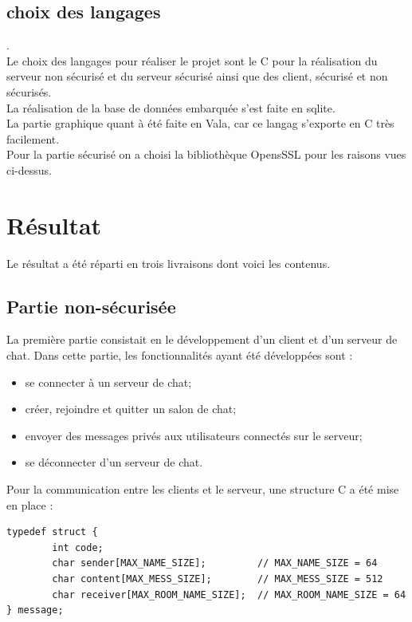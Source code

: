 \documentclass[a4paper,11pt,french]{book}
\begin{document}
\subsection{choix des langages}
.\\
Le choix des langages pour réaliser le projet sont le C pour la réalisation du serveur non sécurisé et du serveur sécurisé ainsi que des client, sécurisé et non sécurisés.\\La réalisation de la base de données embarquée s'est faite en sqlite.\\La partie graphique quant à été faite en Vala, car ce langag s'exporte en C très facilement.\\
Pour la partie sécurisé on a choisi la bibliothèque OpensSSL pour les raisons vues ci-dessus.

\section{Résultat}

Le résultat a été réparti en trois livraisons dont voici les contenus.

\subsection{Partie non-sécurisée}
La première partie consistait en le développement d'un client et d'un serveur de chat. Dans cette partie, les fonctionnalités ayant été développées sont :
\begin{itemize}
\item se connecter à un serveur de chat;
\item créer, rejoindre et quitter un salon de chat;
\item envoyer des messages privés aux utilisateurs connectés sur le serveur;
\item se déconnecter d'un serveur de chat.
\end{itemize}

Pour la communication entre les clients et le serveur, une structure C a été mise en place :

\begin{verbatim}
typedef struct {
        int code;
        char sender[MAX_NAME_SIZE];         // MAX_NAME_SIZE = 64
        char content[MAX_MESS_SIZE];        // MAX_MESS_SIZE = 512
        char receiver[MAX_ROOM_NAME_SIZE];  // MAX_ROOM_NAME_SIZE = 64
} message;
\end{verbatim}
\end{document}
